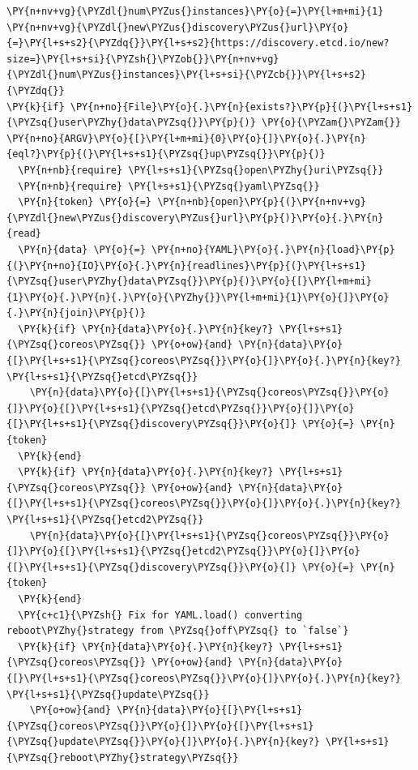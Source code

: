 \begin{codelisting}
\label{code:cloud-config1}
\begin{Verbatim}[fontsize=\relsize{-2.5},fontseries=b,commandchars=\\\{\}]
\PY{n+nv+vg}{\PYZdl{}num\PYZus{}instances}\PY{o}{=}\PY{l+m+mi}{1}
\PY{n+nv+vg}{\PYZdl{}new\PYZus{}discovery\PYZus{}url}\PY{o}{=}\PY{l+s+s2}{\PYZdq{}}\PY{l+s+s2}{https://discovery.etcd.io/new?size=}\PY{l+s+si}{\PYZsh{}\PYZob{}}\PY{n+nv+vg}{\PYZdl{}num\PYZus{}instances}\PY{l+s+si}{\PYZcb{}}\PY{l+s+s2}{\PYZdq{}}
\PY{k}{if} \PY{n+no}{File}\PY{o}{.}\PY{n}{exists?}\PY{p}{(}\PY{l+s+s1}{\PYZsq{}user\PYZhy{}data\PYZsq{}}\PY{p}{)} \PY{o}{\PYZam{}\PYZam{}} \PY{n+no}{ARGV}\PY{o}{[}\PY{l+m+mi}{0}\PY{o}{]}\PY{o}{.}\PY{n}{eql?}\PY{p}{(}\PY{l+s+s1}{\PYZsq{}up\PYZsq{}}\PY{p}{)}
  \PY{n+nb}{require} \PY{l+s+s1}{\PYZsq{}open\PYZhy{}uri\PYZsq{}}
  \PY{n+nb}{require} \PY{l+s+s1}{\PYZsq{}yaml\PYZsq{}}
  \PY{n}{token} \PY{o}{=} \PY{n+nb}{open}\PY{p}{(}\PY{n+nv+vg}{\PYZdl{}new\PYZus{}discovery\PYZus{}url}\PY{p}{)}\PY{o}{.}\PY{n}{read}
  \PY{n}{data} \PY{o}{=} \PY{n+no}{YAML}\PY{o}{.}\PY{n}{load}\PY{p}{(}\PY{n+no}{IO}\PY{o}{.}\PY{n}{readlines}\PY{p}{(}\PY{l+s+s1}{\PYZsq{}user\PYZhy{}data\PYZsq{}}\PY{p}{)}\PY{o}{[}\PY{l+m+mi}{1}\PY{o}{.}\PY{n}{.}\PY{o}{\PYZhy{}}\PY{l+m+mi}{1}\PY{o}{]}\PY{o}{.}\PY{n}{join}\PY{p}{)}
  \PY{k}{if} \PY{n}{data}\PY{o}{.}\PY{n}{key?} \PY{l+s+s1}{\PYZsq{}coreos\PYZsq{}} \PY{o+ow}{and} \PY{n}{data}\PY{o}{[}\PY{l+s+s1}{\PYZsq{}coreos\PYZsq{}}\PY{o}{]}\PY{o}{.}\PY{n}{key?} \PY{l+s+s1}{\PYZsq{}etcd\PYZsq{}}
    \PY{n}{data}\PY{o}{[}\PY{l+s+s1}{\PYZsq{}coreos\PYZsq{}}\PY{o}{]}\PY{o}{[}\PY{l+s+s1}{\PYZsq{}etcd\PYZsq{}}\PY{o}{]}\PY{o}{[}\PY{l+s+s1}{\PYZsq{}discovery\PYZsq{}}\PY{o}{]} \PY{o}{=} \PY{n}{token}
  \PY{k}{end}
  \PY{k}{if} \PY{n}{data}\PY{o}{.}\PY{n}{key?} \PY{l+s+s1}{\PYZsq{}coreos\PYZsq{}} \PY{o+ow}{and} \PY{n}{data}\PY{o}{[}\PY{l+s+s1}{\PYZsq{}coreos\PYZsq{}}\PY{o}{]}\PY{o}{.}\PY{n}{key?} \PY{l+s+s1}{\PYZsq{}etcd2\PYZsq{}}
    \PY{n}{data}\PY{o}{[}\PY{l+s+s1}{\PYZsq{}coreos\PYZsq{}}\PY{o}{]}\PY{o}{[}\PY{l+s+s1}{\PYZsq{}etcd2\PYZsq{}}\PY{o}{]}\PY{o}{[}\PY{l+s+s1}{\PYZsq{}discovery\PYZsq{}}\PY{o}{]} \PY{o}{=} \PY{n}{token}
  \PY{k}{end}
  \PY{c+c1}{\PYZsh{} Fix for YAML.load() converting reboot\PYZhy{}strategy from \PYZsq{}off\PYZsq{} to `false`}
  \PY{k}{if} \PY{n}{data}\PY{o}{.}\PY{n}{key?} \PY{l+s+s1}{\PYZsq{}coreos\PYZsq{}} \PY{o+ow}{and} \PY{n}{data}\PY{o}{[}\PY{l+s+s1}{\PYZsq{}coreos\PYZsq{}}\PY{o}{]}\PY{o}{.}\PY{n}{key?} \PY{l+s+s1}{\PYZsq{}update\PYZsq{}} 
    \PY{o+ow}{and} \PY{n}{data}\PY{o}{[}\PY{l+s+s1}{\PYZsq{}coreos\PYZsq{}}\PY{o}{]}\PY{o}{[}\PY{l+s+s1}{\PYZsq{}update\PYZsq{}}\PY{o}{]}\PY{o}{.}\PY{n}{key?} \PY{l+s+s1}{\PYZsq{}reboot\PYZhy{}strategy\PYZsq{}}

\end{Verbatim}
\end{codelisting}
